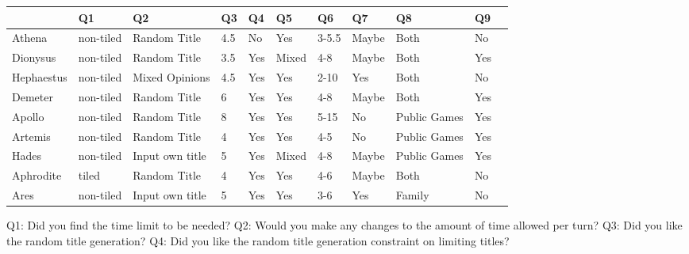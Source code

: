\documentclass{sigchi}
\begin{document}
\begin{tabular}{ | l | l | l | l | l | l | l | l | l | l | l | }
\hline
	  & Q1 & Q2 & Q3 & Q4 & Q5 & Q6 & Q7 & Q8 & Q9 \\ \hline
	Athena & non-tiled & Random Title & 4.5 & No & Yes & 3-5.5 & Maybe & Both & No \\ \hline
	Dionysus & non-tiled & Random Title & 3.5 & Yes & Mixed & 4-8 & Maybe & Both & Yes \\ \hline
	Hephaestus & non-tiled & Mixed Opinions & 4.5 & Yes & Yes & 2-10 & Yes & Both & No \\ \hline
	Demeter & non-tiled & Random Title & 6 & Yes & Yes & 4-8 & Maybe & Both & Yes \\ \hline
	Apollo & non-tiled & Random Title & 8 & Yes & Yes & 5-15 & No & Public Games & Yes \\ \hline
	Artemis & non-tiled & Random Title & 4 & Yes & Yes & 4-5 & No & Public Games & Yes \\ \hline
	Hades & non-tiled & Input own title & 5 & Yes & Mixed & 4-8 & Maybe & Public Games & Yes \\ \hline
	Aphrodite & tiled & Random Title & 4 & Yes & Yes & 4-6 & Maybe & Both & No \\ \hline
	Ares & non-tiled & Input own title & 5 & Yes & Yes & 3-6 & Yes & Family & No \\ \hline
\end{tabular}

\label{apx:questionaire}

Q1: Did you find the time limit to be needed? \newline
Q2: Would you make any changes to the amount of time allowed per turn? \newline
Q3: Did you like the random title generation? \newline
Q4: Did you like the random title generation constraint on limiting titles? \newline
\end{document}
